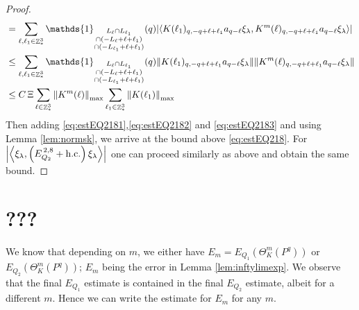 \documentclass[12pt,a4paper]{article}
\numberwithin{equation}{section}
\newcommand{\1}{\mathbb{I}}
\DeclareMathOperator{\Z}{\mathbb{Z}}
\newcommand{\eva}[1]{\left\langle #1 \right\rangle}
\theoremstyle{plain}
\theoremstyle{definition}
\theoremstyle{remark}
\theoremstyle{plain}
\theoremstyle{definition}
\theoremstyle{remark}
\begin{document}
\begin{proof}
\begin{align}
	&= \sum\limits_{\ell, \ell_1\in \Z^3_*} \mathds{1}_{\substack{L_{\ell}\cap L_{\ell_1}\\\cap (-L_{\ell}+\ell+\ell_1) \\ \cap (-L_{\ell_1}+\ell+\ell_1)}} (q) \abs{\eva{K(\ell_1)_{q,-q+\ell+\ell_1} a_{q-\ell} \xi_\lambda, K^m(\ell)_{q,-q+\ell+\ell_1} a_{q-\ell}\xi_\lambda }}\nonumber\\
	&\leq \sum\limits_{\ell, \ell_1\in \Z^3_*} \mathds{1}_{\substack{L_{\ell}\cap L_{\ell_1}\\\cap (-L_{\ell}+\ell+\ell_1) \\ \cap (-L_{\ell_1}+\ell+\ell_1)}} (q) \norm{K(\ell_1)_{q,-q+\ell+\ell_1} a_{q-\ell} \xi_\lambda}\norm{ K^m(\ell)_{q,-q+\ell+\ell_1} a_{q-\ell}\xi_\lambda }\nonumber\\
	&\leq C\,\Xi \sum\limits_{\ell \in \Z^3_*} \norm{K^m(\ell)}_{\max} \sum\limits_{\ell_1 \in \Z^3_*} \norm{K(\ell_1)}_{\max}  \label{eq:estEQ2183}
\end{align} 
Then adding \eqref{eq:estEQ2181},\eqref{eq:estEQ2182} and \eqref{eq:estEQ2183} and using Lemma \ref{lem:normsk}, we arrive at the bound above \eqref{eq:estEQ218}. For $\abs{\eva{\xi_\lambda,\left(E^{\,2,8}_{Q_2}+\mathrm{h.c.}\right) \xi_\lambda }}$ one can proceed similarly as above and obtain the same bound.
\end{proof}


\section{???}


We know that depending on $m$, we either have $E_m = E_{Q_1}(\Theta^m_K(P^q))$ or $E_{Q_2}(\Theta^m_K(P^q))$; $E_m$ being the error in Lemma \ref{lem:inftylimexp}. We observe that the final $E_{Q_1}$ estimate is contained in the final $E_{Q_2}$ estimate, albeit for a different $m$. Hence we can write the estimate for $E_m$ for any $m$. 
\end{document}
